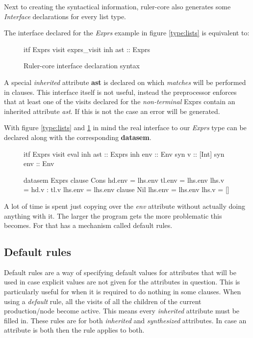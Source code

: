 Next to creating the syntactical information, ruler-core also generates some \emph{Interface} declarations for every list type. 

The interface declared for the \emph{Exprs} example in figure \ref{type:lists} is equivalent to:

\begin{figure}[h!]
\begin{code}
itf Exprs
  visit exprs_visit
    inh ast :: Exprs
\end{code}
\caption{Ruler-core interface declaration syntax}
\label{itf:exprs}
\end{figure}

A special \emph{inherited} attribute \textbf{ast} is declared on which \emph{matches} will be performed in clauses. This interface itself is not useful, instead the preprocessor enforces that at least one of the visits declared for the \emph{non-terminal} Exprs contain an inherited attribute \emph{ast}. If this is not the case an error will be generated.

With figure \ref{type:lists} and \ref{itf:exprs} in mind the real interface to our \emph{Exprs} type can be declared along with the corresponding \textbf{datasem}.

\begin{figure}
\begin{minipage}[t]{0.4\linewidth}
\begin{code}
itf Exprs
  visit eval 
    inh ast  :: Exprs
    inh env  :: Env
    syn v    :: [Int]
    syn env  :: Env
\end{code}
\end{minipage}
\begin{minipage}[t]{0.6\linewidth}
\begin{code}
datasem Exprs
   clause Cons
     hd.env   = lhs.env
     tl.env   = lhs.env
     lhs.v    = hd.v : tl.v
     lhs.env  = lhs.env
   clause Nil
     lhs.env  = lhs.env
     lhs.v    = []
\end{code}
\end{minipage}
\end{figure}

A lot of time is spent just copying over the \emph{env} attribute without actually doing anything with it. The larger the program gets the more problematic this becomes. For that \rcore has a mechanism called default rules.

\subsection{Default rules}
Default rules are a way of specifying default values for attributes that will be used in case explicit values are not given for the attributes in question. This is particularly useful for when it is required to do nothing in some clauses.
When using a \emph{default} rule, all the visits of all the children of the current production/node become active. This means every \emph{inherited} attribute must be filled in.
These rules are for both \emph{inherited} and \emph{synthesized} attributes. In case an attribute is both then the rule applies to both. 

